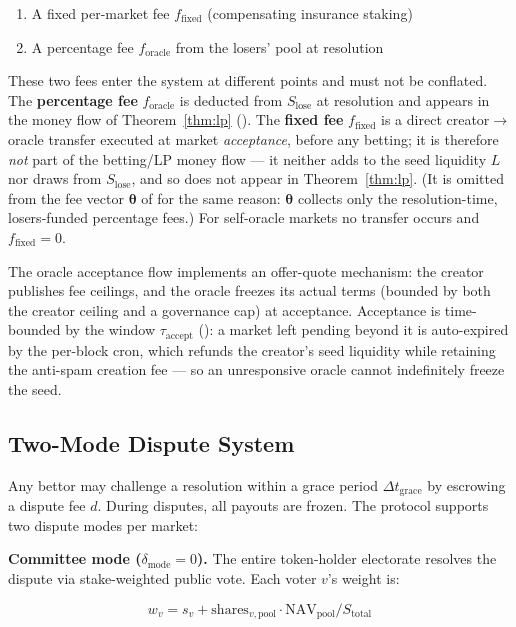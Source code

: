 \documentclass{ledger}
\theoremstyle{plain}
\theoremstyle{remark}
\begin{document}
\begin{enumerate}
  \item A fixed per-market fee $f_{\text{fixed}}$ (compensating insurance
  staking)
  \item A percentage fee $f_{\text{oracle}}$ from the losers' pool at resolution
\end{enumerate}

These two fees enter the system at different points and must not be conflated.
The \textbf{percentage fee} $f_{\text{oracle}}$ is deducted from
$S_{\text{lose}}$ at resolution and appears in the money flow of
Theorem~\ref{thm:lp} (). The \textbf{fixed fee}
$f_{\text{fixed}}$ is a direct creator$\rightarrow$oracle transfer executed at
market \emph{acceptance}, before any betting; it is therefore \emph{not} part of
the betting/LP money flow --- it neither adds to the seed liquidity $L$ nor draws
from $S_{\text{lose}}$, and so does not appear in Theorem~\ref{thm:lp}. (It is
omitted from the fee vector $\boldsymbol{\theta}$ of  for the same
reason: $\boldsymbol{\theta}$ collects only the resolution-time, losers-funded
percentage fees.) For self-oracle markets no transfer occurs and
$f_{\text{fixed}} = 0$.

The oracle acceptance flow implements an offer-quote mechanism: the creator
publishes fee ceilings, and the oracle freezes its actual terms (bounded by both
the creator ceiling and a governance cap) at acceptance. Acceptance is
time-bounded by the window $\tau_{\text{accept}}$ (): a market left
pending beyond it is auto-expired by the per-block cron, which refunds the
creator's seed liquidity while retaining the anti-spam creation fee --- so an
unresponsive oracle cannot indefinitely freeze the seed.

\subsection{Two-Mode Dispute System}\label{sec:disputemodes}

Any bettor may challenge a resolution within a grace period
$\Delta t_{\text{grace}}$ by escrowing a dispute fee $d$. During disputes, all
payouts are frozen. The protocol supports two dispute modes per market:

\textbf{Committee mode ($\delta_{\text{mode}} = 0$).} The entire token-holder
electorate resolves the dispute via stake-weighted public vote. Each voter $v$'s
weight is:

\[
w_v = s_v + \text{shares}_{v,\text{pool}} \cdot \text{NAV}_{\text{pool}} /
S_{\text{total}}
\]
\end{document}
